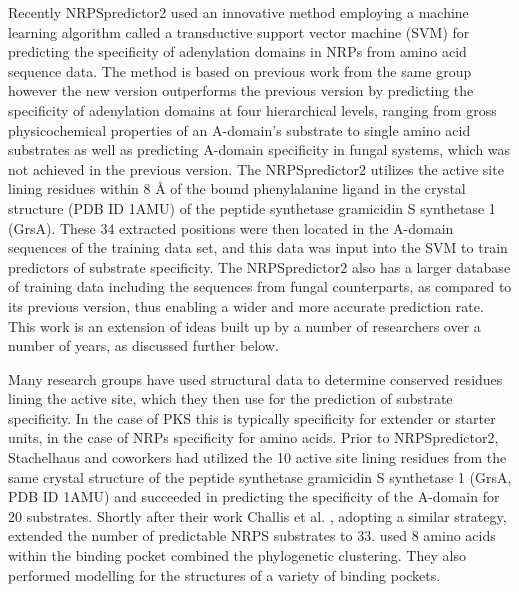 \begin{doublespacing}
		Recently NRPSpredictor2 \parencite{Rottig2011} used an innovative method employing a machine learning algorithm called a transductive support vector machine (SVM) for predicting the specificity of adenylation domains in NRPs from amino acid sequence data. The method is based on previous work \parencite{Rausch2005} from the same group however the new version outperforms the previous version by predicting the specificity of adenylation domains at four hierarchical levels, ranging from gross physicochemical properties of an A-domain's substrate to single amino acid substrates as well as predicting A-domain specificity in fungal systems, which was not achieved in the previous version. The NRPSpredictor2 utilizes the active site lining residues within 8 \AA{} of the bound phenylalanine ligand in the crystal structure (PDB ID 1AMU) of the peptide synthetase gramicidin S synthetase 1 (GrsA). These 34 extracted positions were then located in the A-domain sequences of the training data set, and this data was input into the SVM to train predictors of substrate specificity. The NRPSpredictor2 also has a larger database of training data including the sequences from fungal counterparts, as compared to its previous version, thus enabling a wider and more accurate prediction rate. This work is an extension of ideas built up by a number of researchers over a number of years, as discussed further below.
		
		Many research groups have used structural data to determine conserved residues lining the active site, which they then use for the prediction of substrate specificity. In the case of PKS this is typically specificity for extender or starter units, in the case of NRPs specificity for amino acids. Prior to NRPSpredictor2, Stachelhaus and coworkers \parencite{Stachelhaus1999} had utilized the 10 active site lining residues from the same crystal structure of the peptide synthetase gramicidin S synthetase 1 (GrsA, PDB ID 1AMU) and succeeded in predicting the specificity of the A-domain for 20 substrates. Shortly after their work Challis et al. \parencite{Challis2000}, adopting a similar strategy, extended the number of predictable NRPS substrates to 33. \textcite{Challis2000} used 8 amino acids within the binding pocket combined the phylogenetic clustering. They also performed modelling for the structures of a variety of binding pockets.
		

\end{doublespacing}
